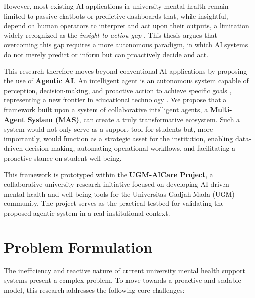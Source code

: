 However, most existing AI applications in university mental health remain limited to passive chatbots or predictive dashboards that, while insightful, depend on human operators to interpret and act upon their outputs, a limitation widely recognized as the \textit{insight-to-action gap} \cite{jorno2018actionableinsight, susnjak2022dashboard}. This thesis argues that overcoming this gap requires a more autonomous paradigm, in which AI systems do not merely predict or inform but can proactively decide and act.

This research therefore moves beyond conventional AI applications by proposing the use of \textbf{Agentic AI}. An intelligent agent is an autonomous system capable of perception, decision-making, and proactive action to achieve specific goals \cite{saleem2025multiagent, wooldridge2009introductionmas}, representing a new frontier in educational technology \cite{salutari2024mas}. We propose that a framework built upon a system of collaborative intelligent agents, a \textbf{Multi-Agent System (MAS)}, can create a truly transformative ecosystem. Such a system would not only serve as a support tool for students but, more importantly, would function as a strategic asset for the institution, enabling data-driven decision-making, automating operational workflows, and facilitating a proactive stance on student well-being. 

This framework is prototyped within the \textbf{UGM-AICare Project}, a collaborative university research initiative focused on developing AI-driven mental health and well-being tools for the Universitas Gadjah Mada (UGM) community. The project serves as the practical testbed for validating the proposed agentic system in a real institutional context.



\section{Problem Formulation}
\label{sec:problem_formulation}

The inefficiency and reactive nature of current university mental health support systems present a complex problem. To move towards a proactive and scalable model, this research addresses the following core challenges:

